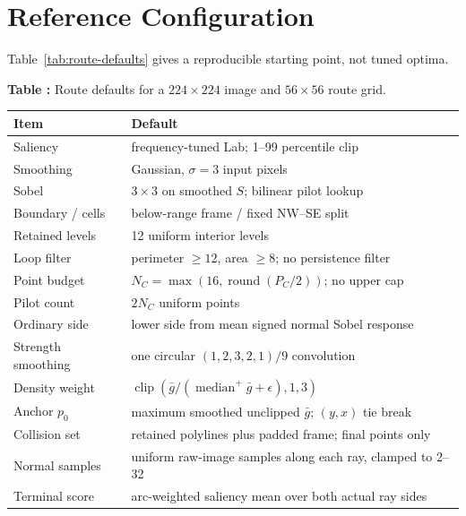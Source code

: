 \section{Reference Configuration}

\scriptsize

Table~\ref{tab:route-defaults} gives a reproducible starting point, not tuned optima.

\begin{center}
\label{tab:route-defaults}
\begin{minipage}{\columnwidth}
\centering
\small\textbf{Table \thetable:} Route defaults for a $224\times224$ image and $56\times56$ route grid.

\vspace{2pt}
\scriptsize
\begin{tabular}{@{}p{}p{}@{}}
\toprule
Item & Default \\
\midrule
Saliency & frequency-tuned Lab; 1--99 percentile clip \\
Smoothing & Gaussian, $\sigma=3$ input pixels \\
Sobel & $3\times3$ on smoothed $S$; bilinear pilot lookup \\
Boundary / cells & below-range frame / fixed NW--SE split \\
Retained levels & 12 uniform interior levels \\
Loop filter & perimeter $\geq12$, area $\geq8$; no persistence filter \\
Point budget & $N_C=\max(16,\operatorname{round}(P_C/2))$; no upper cap \\
Pilot count & $2N_C$ uniform points \\
Ordinary side & lower side from mean signed normal Sobel response \\
Strength smoothing & one circular $(1,2,3,2,1)/9$ convolution \\
Density weight & $\operatorname{clip}(\bar g/(\operatorname{median}^{+}\bar g+\epsilon),1,3)$ \\
Anchor $p_0$ & maximum smoothed unclipped $\bar g$; $(y,x)$ tie break \\
Collision set & retained polylines plus padded frame; final points only \\
Normal samples & uniform raw-image samples along each ray, clamped to 2--32 \\
Terminal score & arc-weighted saliency mean over both actual ray sides \\
\bottomrule
\end{tabular}
\end{minipage}
\end{center}

